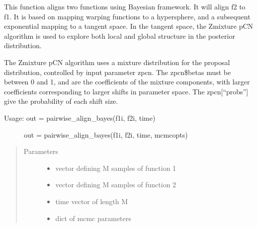 \documentclass[letterpaper,10pt,english]{sphinxmanual}
\begin{document}

\begin{fulllineitems}
\label{\detokenize{time_warping:time_warping.pairwise_align_bayes}}
This function aligns two functions using Bayesian framework. It will align
f2 to f1. It is based on mapping warping functions to a hypersphere, and a
subsequent exponential mapping to a tangent space. In the tangent space,
the Z\sphinxhyphen{}mixture pCN algorithm is used to explore both local and global
structure in the posterior distribution.

The Z\sphinxhyphen{}mixture pCN algorithm uses a mixture distribution for the proposal
distribution, controlled by input parameter zpcn. The zpcn\$betas must be
between 0 and 1, and are the coefficients of the mixture components, with
larger coefficients corresponding to larger shifts in parameter space. The
zpcn{[}“probs”{]} give the probability of each shift size.
\begin{description}
\item[{Usage:  out = pairwise\_align\_bayes(f1i, f2i, time)}] \leavevmode
out = pairwise\_align\_bayes(f1i, f2i, time, mcmcopts)

\end{description}
\begin{quote}\begin{description}
\item[{Parameters}] \leavevmode\begin{itemize}
\item {} 
 \textendash{} vector defining M samples of function 1

\item {} 
 \textendash{} vector defining M samples of function 2

\item {} 
 \textendash{} time vector of length M

\item {} 
 \textendash{} dict of mcmc parameters

\end{itemize}


\end{description}
\end{quote}
\end{fulllineitems}
\end{document}
